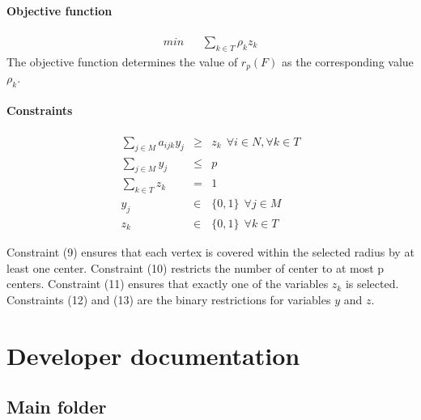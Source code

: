 \documentclass[a4paper,10pt]{article}
\begin{document}
	\paragraph{Objective function}
	\begin{eqnarray}
		min && \sum_{k \in T} \rho_{k} z_{k}	
	\end{eqnarray}
	The objective function determines the value of $r_p(F)$ as the corresponding value $\rho_k$.
	
	\paragraph{Constraints}
	\begin{eqnarray}
    	\sum_{j \in M} a_{ijk} y_{j} &\geq& z_k ~~\forall i \in N, \forall k \in T \\
		\sum_{j \in M} y_{j} &\leq& p \\
		\sum_{k \in T} z_{k} &=& 1 \\
		y_j &\in& \{ 0,1 \} ~~\forall j \in M \\
		z_{k} &\in& \{0 , 1 \} ~~\forall k \in T 
	\end{eqnarray}
	
	Constraint (9) ensures that each vertex is covered within the selected radius by at least one center.
	Constraint (10) restricts the number of center to at most p centers.
	Constraint (11) ensures that exactly one of the variables $z_k$ is selected. 
	Constraints (12) and (13) are the binary restrictions for variables $y$ and $z$. 
	


\section{Developer documentation}
\subsection{Main folder}
\end{document}
